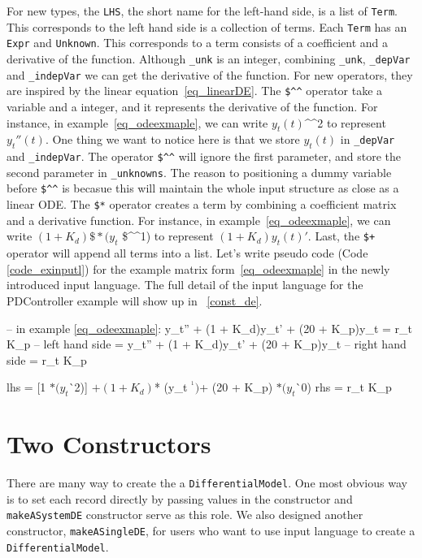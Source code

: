 For new types, the \verb|LHS|, the short name for the left-hand side, is a list of \verb|Term|. This corresponds to the left hand side is a collection of terms. Each \verb|Term| has an \verb|Expr| and \verb|Unknown|. This corresponds to a term consists of a coefficient and a derivative of the function. Although \verb|_unk| is an integer, combining \verb|_unk|, \verb|_depVar| and \verb|_indepVar| we can get the derivative of the function. For new operators, they are inspired by the linear equation~\ref{eq_linearDE}. The \verb|$^^| operator take a variable and a integer, and it represents the derivative of the function. For instance, in example~\ref{eq_odeexmaple}, we can write $y_t(t)$\^{}\^{}2 to represent $y_t''(t)$. One thing we want to notice here is that we store $y_t(t)$ in \verb|_depVar| and \verb|_indepVar|. The operator \verb|$^^| will ignore the first parameter, and store the second parameter in \verb|_unknowns|. The reason to positioning a dummy variable before \verb|$^^| is becasue this will maintain the whole input structure as close as a linear ODE. The \verb|$*| operator creates a term by combining a coefficient matrix and a derivative function. For instance, in example~\ref{eq_odeexmaple}, we can write $(1 + K_d) \$* (y_t$ \$\^{}\^{}1) to represent $(1 + K_d)y_t(t)'$. Last, the \verb|$+| operator will append all terms into a list. Let's write pseudo code (Code \ref{code_exinputl}) for the example matrix form~\ref{eq_odeexmaple} in the newly introduced input language. The full detail of the input language for the PDController example will show up in ~\ref{const_de}.

\begin{listing}[ht]
\begin{haskell1}
-- in example \ref{eq_odeexmaple}: y\_t'' + (1 + K\_d)y\_t' + (20 + K\_p)y\_t = r\_t K\_p
-- left hand side = y\_t'' + (1 + K\_d)y\_t' + (20 + K\_p)y\_t 
-- right hand side = r\_t K\_p

lhs = [1 $* (y_t $^^ 2)]
	$+ (1 + K_d) $* (y_t $^^ 1)
	$+ (20 + K_p) $* (y_t $^^ 0)
rhs = r_t K_p
\end{haskell1}
\label{code_exinputl}
\end{listing}

\section{Two Constructors}
There are many way to create the a \verb|DifferentialModel|. One most obvious way is to set each record directly by passing values in the constructor and \verb|makeASystemDE| constructor serve as this role. We also designed another constructor, \verb|makeASingleDE|, for users who want to use input language to create a \verb|DifferentialModel|.

